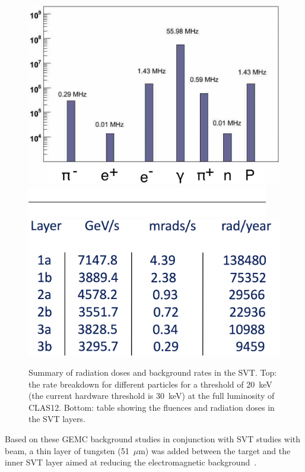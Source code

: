\begin{figure}[ht]
	\centering
	\includegraphics[width=0.99\columnwidth,keepaspectratio]{img/bstRates.png}
	\includegraphics[width=0.99\columnwidth,keepaspectratio]{img/blank.png}
	\includegraphics[width=0.99\columnwidth,keepaspectratio]{img/bstRadSummary.png}
	\caption{Summary of radiation doses and background rates in the SVT. Top: the rate breakdown for different
          particles for a threshold of 20~keV (the current hardware threshold is 30~keV) at the full luminosity of
          CLAS12. Bottom: table showing the fluences and radiation doses in the SVT layers. }
	\label{fig:radStudy}
\end{figure}

Based on these GEMC background studies in conjunction with SVT studies with beam, a thin layer of tungsten
(51~$\mu$m) was added between the target and the inner SVT layer aimed at reducing the electromagnetic
background~\cite{bstDose}.
